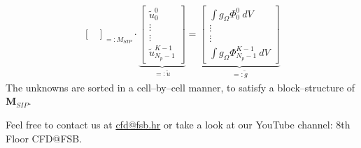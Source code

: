 \documentclass[b1b,portrait]{b0poster}
\begin{document}
\begin{minipage}[t][79cm][t]{0.3\linewidth}
\begin{align*}
{\begin{bmatrix}
\end{bmatrix}}_{=: M_{SIP}} \cdot
\underbrace{\begin{bmatrix}
\tilde{u}^0_0\\
\vdots \\
\vdots \\
\tilde{u}^{K - 1}_{N_p - 1}
\end{bmatrix}}_{=: \tilde{u}} =
\underbrace{\begin{bmatrix}
\int g_{\Omega} \Phi^0_0\ dV\\
\vdots \\
\vdots \\
\int g_{\Omega} \Phi^{K - 1}_{N_p - 1}\ dV
\end{bmatrix}}_{=: \tilde{g}}
\end{align*}
\large
The unknowns are sorted in a cell--by--cell manner, to satisfy a
block--structure of $\mathbf{M}_{SIP}$.


\end{minipage}


\vspace{1.6cm}




\begin{minipage}[t][0.6cm][c]{\linewidth}
  \begin{center}
      \vspace{0.8cm}
      \large
      Feel free to contact us at
      \href{mailto:cfd@fsb.hr}{cfd@fsb.hr}
      or take a look at our
      YouTube channel: 8th Floor CFD@FSB.
  \end{center}
\end{minipage}
\end{document}
